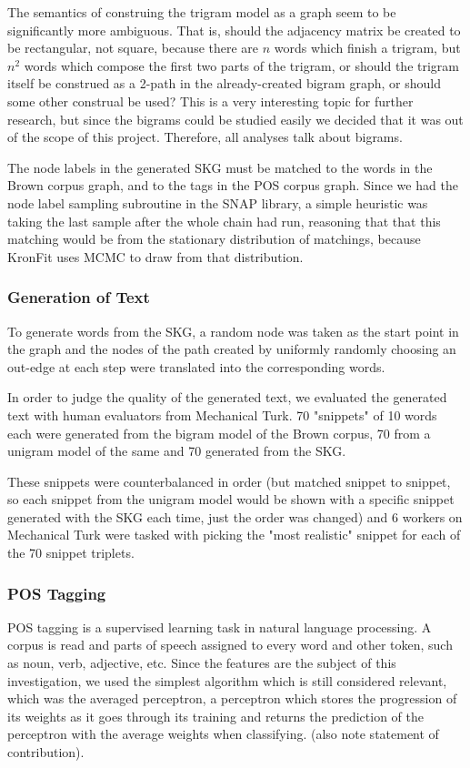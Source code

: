 \documentclass[12pt]{article}
\begin{document}
The semantics of construing the trigram model as a graph seem to be significantly more ambiguous. That is, should the adjacency matrix be created to be rectangular, not square, because there are $n$ words which finish a trigram, but $n^2$ words which compose the first two parts of the trigram, or should the trigram itself be construed as a 2-path in the already-created bigram graph, or should some other construal be used? This is a very interesting topic for further research, but since the bigrams could be studied easily we decided that it was out of the scope of this project. Therefore, all analyses talk about bigrams.

The node labels in the generated SKG must be matched to the words in the Brown corpus graph, and to the tags in the POS corpus graph. Since we had the node label sampling subroutine in the SNAP library, a simple heuristic was taking the last sample after the whole chain had run, reasoning that that this matching would be from the stationary distribution of matchings, because KronFit uses MCMC to draw from that distribution.

\subsubsection*{Generation of Text}

To generate words from the SKG, a random node was taken as the start point in the graph and the nodes of the path created by uniformly randomly choosing an out-edge at each step were translated into the corresponding words.

In order to judge the quality of the generated text, we evaluated the generated text with human evaluators from Mechanical Turk. 70 "snippets" of 10 words each were generated from the bigram model of the Brown corpus, 70 from a unigram model of the same and 70 generated from the SKG.

These snippets were counterbalanced in order (but matched snippet to snippet, so each snippet from the unigram model would be shown with a specific snippet generated with the SKG each time, just the order was changed) and 6 workers on Mechanical Turk were tasked with picking the "most realistic" snippet for each of the 70 snippet triplets.

\subsubsection*{POS Tagging}

POS tagging is a supervised learning task in natural language processing. A corpus is read and parts of speech assigned to every word and other token, such as noun, verb, adjective, etc. Since the features are the subject of this investigation, we used the simplest algorithm which is still considered relevant, which was the averaged perceptron, a perceptron which stores the progression of its weights as it goes through its training and returns the prediction of the perceptron with the average weights when classifying. (also note statement of contribution). %
\end{document}

